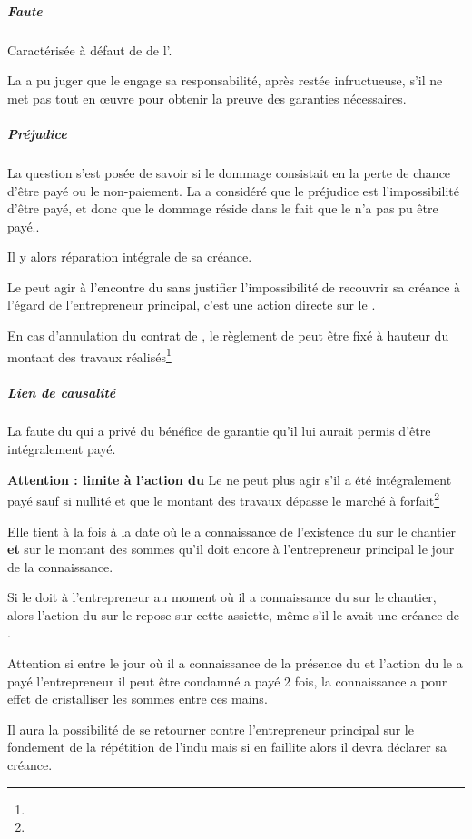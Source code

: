				\subparagraph{Faute}
				Caractérisée à défaut de \MED de l’\ep.


				La \CourDeCas a pu juger que le \MO engage sa responsabilité, après \med restée infructueuse, s’il ne met pas tout en œuvre pour obtenir la preuve des garanties nécessaires.


				\subparagraph{Préjudice}



				La question s’est posée de savoir si le dommage consistait en la perte de chance d'être payé ou le non-paiement.
 La \JP a considéré que le préjudice est l’impossibilité d’être payé, et donc que le dommage réside dans le fait que le \ST n’a pas pu être payé..

				Il y alors réparation intégrale de sa créance.

				Le \ST peut agir à l’encontre du \MO sans justifier l’impossibilité de recouvrir sa créance à l’égard de l’entrepreneur principal, c’est une action directe sur le \MO.

				En cas d’annulation du contrat de \ST*, le règlement de \DI peut être fixé à hauteur du montant des travaux réalisés\footnote{}

				\subparagraph{Lien de causalité}

				La faute du \MO qui a privé \ST du bénéfice de garantie qu’il lui aurait permis d’être intégralement payé.

				\bigbreak \textbf{Attention : limite à l'action du \ST} Le \ST ne peut plus agir s’il a été intégralement payé sauf si nullité et que le montant des travaux dépasse le marché à forfait\footnote{\aVerifier}

				Elle tient à la fois à la date où le \MO a connaissance de l’existence du \ST sur le chantier \textbf{et} sur le montant des sommes qu’il doit encore à l’entrepreneur principal le jour de la connaissance.

				Si le \MO doit  à l’entrepreneur au moment où il a connaissance du \ST sur le chantier, alors l’action du \ST sur le \MO repose sur cette assiette, même s’il le \ST avait une créance de .


				Attention si entre le jour où il a connaissance de la présence du \ST et l’action du \ST le \MO a payé l’entrepreneur il peut être condamné a payé 2 fois, la connaissance a pour effet de cristalliser les sommes entre ces mains.\aVerifier

				Il aura la possibilité de se retourner contre l’entrepreneur principal sur le fondement de la répétition de l’indu mais si en faillite alors il devra déclarer sa créance.


